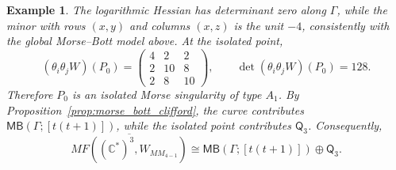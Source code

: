 \documentclass[11pt]{amsart}
\newtheorem{example}{Example}[section]
\newcommand{\MorseCat}[1]{\mathsf{Q}_{#1}}
\newcommand{\MBtwcat}[2]{\mathsf{MB}(#1;[#2])}
\begin{document}
\begin{example}
The logarithmic Hessian has determinant zero along $\Gamma$, while the minor
with rows $(x,y)$ and columns $(x,z)$ is the unit $-4$, consistently with the
global Morse--Bott model above. At the isolated point,
\[
(\theta_i\theta_jW)(P_0)=
\begin{pmatrix}
4 & 2 & 2 \\
2 & 10 & 8 \\
2 & 8 & 10
\end{pmatrix},
\qquad
\det(\theta_i\theta_jW)(P_0)=128.
\]
Therefore $P_0$ is an isolated Morse singularity of type $A_1$. By
Proposition~\ref{prop:morse_bott_clifford}, the curve contributes
$\MBtwcat{\Gamma}{t(t+1)}$, while the isolated point contributes
$\MorseCat{3}$.
Consequently,
\[
\overline{MF((\mathbb{C}^*)^3,W_{MM_{4-1}})}
\cong \MBtwcat{\Gamma}{t(t+1)}\oplus \MorseCat{3}.
\]
\end{example}
\end{document}
